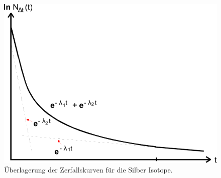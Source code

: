 \begin{figure}
    \centering
    \includegraphics{Abbildungen/Zerfallskurven.pdf}
    \caption{Überlagerung der Zerfallskurven für die Silber Isotope.}
    \label{fig:teo_e-funktionen-krampf}
\end{figure}


